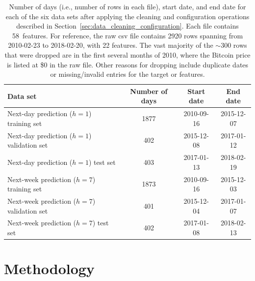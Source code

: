 \documentclass{article}
\begin{document}
\begin{table}[ht]
\begin{center}
\caption{\label{tab:datasets} Number of days (i.e., number of rows in each file), start date, and end date for each of the six data sets after applying the cleaning and configuration operations described in Section~\ref{sec:data_cleaning_configuration}. Each file contains 58~features. For reference, the raw csv file contains 2920 rows spanning from 2010-02-23 to 2018-02-20, with 22 features. The vast majority of the $\sim$300 rows that were dropped are in the first several months of 2010, where the Bitcoin price is listed at \$0 in the raw file. Other reasons for dropping include duplicate dates or missing/invalid entries for the target or features.}
\begin{tabular}{| l | c c c|} 
 \hline
 \hspace{50pt}Data set & Number of days & Start date & End date \\ 
 \hline
 Next-day prediction ($h=1$) training set & 1877 & 2010-09-16 & 2015-12-07 \\ 
 Next-day prediction ($h=1$) validation set & 402 & 2015-12-08 & 2017-01-12 \\ 
 Next-day prediction ($h=1$) test set & 403 & 2017-01-13 & 2018-02-19 \\ 
 Next-week prediction ($h=7$) training set & 1873 & 2010-09-16 & 2015-12-03 \\
 Next-week prediction ($h=7$) validation set & 401 & 2015-12-04 & 2017-01-07 \\ 
 Next-week prediction ($h=7$) test set & 402 & 2017-01-08 & 2018-02-13 \\  
 \hline
\end{tabular}
\end{center}
\end{table}
\vspace{-20pt}
\section{Methodology}
\label{sec:methodology}
\end{document}
